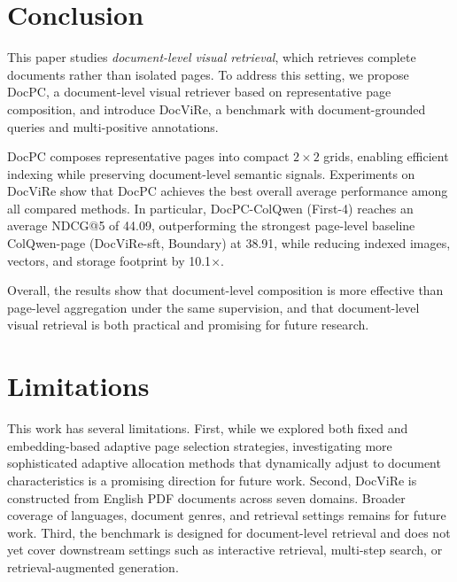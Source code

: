 \section{Conclusion}

This paper studies \emph{document-level visual retrieval}, which retrieves complete documents rather than isolated pages. To address this setting, we propose DocPC, a document-level visual retriever based on representative page composition, and introduce DocViRe, a benchmark with document-grounded queries and multi-positive annotations.

DocPC composes representative pages into compact $2{\times}2$ grids, enabling efficient indexing while preserving document-level semantic signals. Experiments on DocViRe show that DocPC achieves the best overall average performance among all compared methods. In particular, DocPC-ColQwen (First-4) reaches an average NDCG@5 of 44.09, outperforming the strongest page-level baseline ColQwen-page (DocViRe-sft, Boundary) at 38.91, while reducing indexed images, vectors, and storage footprint by 10.1$\times$.

Overall, the results show that document-level composition is more effective than page-level aggregation under the same supervision, and that document-level visual retrieval is both practical and promising for future research.

\section{Limitations}
This work has several limitations. First, while we explored both fixed and embedding-based adaptive page selection strategies, investigating more sophisticated adaptive allocation methods that dynamically adjust to document characteristics is a promising direction for future work. Second, DocViRe is constructed from English PDF documents across seven domains. Broader coverage of languages, document genres, and retrieval settings remains for future work. Third, the benchmark is designed for document-level retrieval and does not yet cover downstream settings such as interactive retrieval, multi-step search, or retrieval-augmented generation.